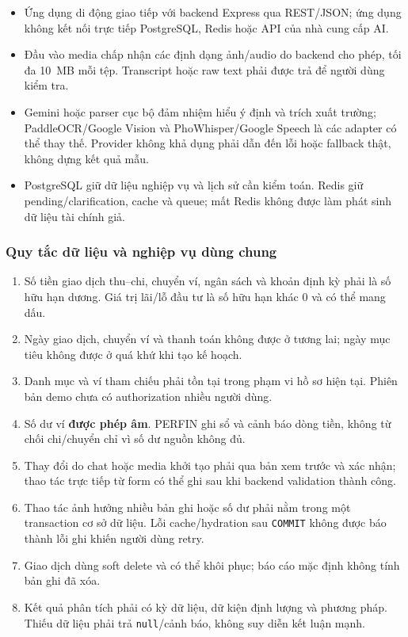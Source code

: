 \begin{itemize}
  \item Ứng dụng di động giao tiếp với backend Express qua REST/JSON; ứng dụng không kết nối trực tiếp PostgreSQL, Redis hoặc API của nhà cung cấp AI.
  \item Đầu vào media chấp nhận các định dạng ảnh/audio do backend cho phép, tối đa 10~MB mỗi tệp. Transcript hoặc raw text phải được trả để người dùng kiểm tra.
  \item Gemini hoặc parser cục bộ đảm nhiệm hiểu ý định và trích xuất trường; PaddleOCR/Google Vision và PhoWhisper/Google Speech là các adapter có thể thay thế. Provider không khả dụng phải dẫn đến lỗi hoặc fallback thật, không dựng kết quả mẫu.
  \item PostgreSQL giữ dữ liệu nghiệp vụ và lịch sử cần kiểm toán. Redis giữ pending/clarification, cache và queue; mất Redis không được làm phát sinh dữ liệu tài chính giả.
\end{itemize}

\subsubsection{Quy tắc dữ liệu và nghiệp vụ dùng chung}

\begin{enumerate}
  \item Số tiền giao dịch thu--chi, chuyển ví, ngân sách và khoản định kỳ phải là số hữu hạn dương. Giá trị lãi/lỗ đầu tư là số hữu hạn khác 0 và có thể mang dấu.
  \item Ngày giao dịch, chuyển ví và thanh toán không được ở tương lai; ngày mục tiêu không được ở quá khứ khi tạo kế hoạch.
  \item Danh mục và ví tham chiếu phải tồn tại trong phạm vi hồ sơ hiện tại. Phiên bản demo chưa có authorization nhiều người dùng.
  \item Số dư ví \textbf{được phép âm}. PERFIN ghi sổ và cảnh báo dòng tiền, không từ chối chi/chuyển chỉ vì số dư nguồn không đủ.
  \item Thay đổi do chat hoặc media khởi tạo phải qua bản xem trước và xác nhận; thao tác trực tiếp từ form có thể ghi sau khi backend validation thành công.
  \item Thao tác ảnh hưởng nhiều bản ghi hoặc số dư phải nằm trong một transaction cơ sở dữ liệu. Lỗi cache/hydration sau \texttt{COMMIT} không được báo thành lỗi ghi khiến người dùng retry.
  \item Giao dịch dùng soft delete và có thể khôi phục; báo cáo mặc định không tính bản ghi đã xóa.
  \item Kết quả phân tích phải có kỳ dữ liệu, dữ kiện định lượng và phương pháp. Thiếu dữ liệu phải trả \texttt{null}/cảnh báo, không suy diễn kết luận mạnh.
\end{enumerate}

